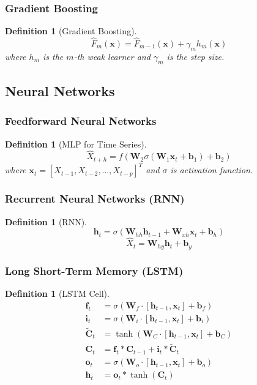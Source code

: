 \documentclass[11pt,a4paper]{article}
\newtheorem{definition}[theorem]{Definition}
\begin{document}
\subsubsection{Gradient Boosting}

\begin{definition}[Gradient Boosting]
$$\hat{F}_m(\mathbf{x}) = \hat{F}_{m-1}(\mathbf{x}) + \gamma_m h_m(\mathbf{x})$$
where $h_m$ is the $m$-th weak learner and $\gamma_m$ is the step size.
\end{definition}

\subsection{Neural Networks}

\subsubsection{Feedforward Neural Networks}

\begin{definition}[MLP for Time Series]
$$\hat{X}_{t+h} = f(\mathbf{W}_2 \sigma(\mathbf{W}_1 \mathbf{x}_t + \mathbf{b}_1) + \mathbf{b}_2)$$
where $\mathbf{x}_t = [X_{t-1}, X_{t-2}, \ldots, X_{t-p}]^T$ and $\sigma$ is activation function.
\end{definition}

\subsubsection{Recurrent Neural Networks (RNN)}

\begin{definition}[RNN]
$$\mathbf{h}_t = \sigma(\mathbf{W}_{hh}\mathbf{h}_{t-1} + \mathbf{W}_{xh}\mathbf{x}_t + \mathbf{b}_h)$$
$$\hat{X}_t = \mathbf{W}_{hy}\mathbf{h}_t + \mathbf{b}_y$$
\end{definition}

\subsubsection{Long Short-Term Memory (LSTM)}

\begin{definition}[LSTM Cell]
\begin{align}
\mathbf{f}_t &= \sigma(\mathbf{W}_f \cdot [\mathbf{h}_{t-1}, \mathbf{x}_t] + \mathbf{b}_f) \\
\mathbf{i}_t &= \sigma(\mathbf{W}_i \cdot [\mathbf{h}_{t-1}, \mathbf{x}_t] + \mathbf{b}_i) \\
\tilde{\mathbf{C}}_t &= \tanh(\mathbf{W}_C \cdot [\mathbf{h}_{t-1}, \mathbf{x}_t] + \mathbf{b}_C) \\
\mathbf{C}_t &= \mathbf{f}_t * \mathbf{C}_{t-1} + \mathbf{i}_t * \tilde{\mathbf{C}}_t \\
\mathbf{o}_t &= \sigma(\mathbf{W}_o \cdot [\mathbf{h}_{t-1}, \mathbf{x}_t] + \mathbf{b}_o) \\
\mathbf{h}_t &= \mathbf{o}_t * \tanh(\mathbf{C}_t)
\end{align}
\end{definition}
\end{document}
